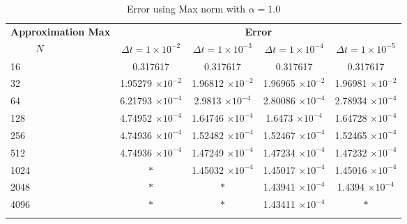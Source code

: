 \begin{table}[H]
		\vspace{1cm}
		\begin{tabular}{lcccc}
			\toprule
			\multicolumn{1}{c}{\textbf{Approximation Max}} & \multicolumn{4}{c}{\textbf{Error}} \\
			$\hspace{9mm}N$ & $\Delta t=1\times 10^{-2}$ & $\Delta t=1\times 10^{-3}$ & $\Delta t=1\times 10^{-4}$ & $\Delta t=1\times 10^{-5}$ \\
			\midrule
			\hspace{7mm} 16 & 0.317617    & 0.317617    & 0.317617    & 0.317617    \\
			\midrule
			\hspace{7mm} 32 & 1.95279 $\times 10 ^{-2}$  & 1.96812 $\times 10 ^{-2}$   & 1.96965 $\times 10 ^{-2}$   & 1.96981 $\times 10 ^{-2}$   \\
			\midrule
			\hspace{7mm} 64 & 6.21793 $\times 10 ^{-4}$ & 2.9813 $\times 10 ^{-4}$  & 2.80086 $\times 10 ^{-4}$ & 2.78934 $\times 10 ^{-4}$ \\
			\midrule
			\hspace{7mm} 128 & 4.74952 $\times 10 ^{-4}$ & 1.64746 $\times 10 ^{-4}$ & 1.6473 $\times 10 ^{-4}$  & 1.64728 $\times 10 ^{-4}$ \\
			\midrule
			\hspace{7mm} 256 & 4.74936 $\times 10 ^{-4}$ & 1.52482 $\times 10 ^{-4}$ & 1.52467 $\times 10 ^{-4}$ & 1.52465 $\times 10 ^{-4}$ \\
			\midrule
			\hspace{7mm} 512 & 4.74936 $\times 10 ^{-4}$ & 1.47249 $\times 10 ^{-4}$ & 1.47234 $\times 10 ^{-4}$ & 1.47232 $\times 10 ^{-4}$ \\
			\midrule
			\hspace{7mm} 1024 & $\ast$           & 1.45032 $\times 10 ^{-4}$ & 1.45017 $\times 10 ^{-4}$ & 1.45016 $\times 10 ^{-4}$ \\
			\midrule
			\hspace{7mm} 2048 & $\ast$           & $\ast$           & 1.43941 $\times 10 ^{-4}$ & 1.4394 $\times 10 ^{-4}$ \\
			\midrule
			\hspace{7mm} 4096 & $\ast$           & $\ast$           & 1.43411 $\times 10 ^{-4}$ & $\ast$           \\
			\\
			\bottomrule
		\end{tabular}
		\caption{Error using Max norm with $\alpha=1.0$}
		\label{Collocation_tabla_max_alpha=1}
	\end{table}
	
